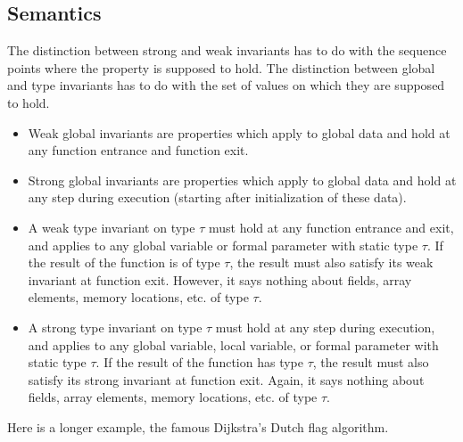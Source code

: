 \subsection{Semantics}

The distinction between strong and weak invariants has to do with the
sequence points where the property is supposed to hold. The distinction
between global and type invariants has to do with the set of values on
which they are supposed to hold.

\begin{itemize}
\item Weak global invariants are properties which apply to global
  data and hold at any function entrance and function exit.

\item Strong global invariants are properties which apply to global
  data and hold at any step during execution (starting after
  initialization of these data).

\item A weak type invariant on type $\tau$ must hold at any function
  entrance and exit, and applies to any global variable or formal
  parameter with static type $\tau$. If the result of the
  function is of type $\tau$, the result must also satisfy its
  weak invariant at function exit. However, it says nothing about fields,
  array elements, memory locations, etc. of type $\tau$.

\item A strong type invariant on type $\tau$ must hold at any step
  during execution, and applies to any global variable, local
  variable, or formal parameter
  with static type $\tau$. If the
  result of the function has type $\tau$, the result must also
  satisfy its strong invariant at function exit. Again, it says
  nothing about fields, array elements, memory locations, etc. of type
  $\tau$.

\end{itemize}


\begin{example}

\end{example}

\begin{example}
  Here is a longer example, the famous Dijkstra's Dutch flag algorithm.\\
\end{example}

